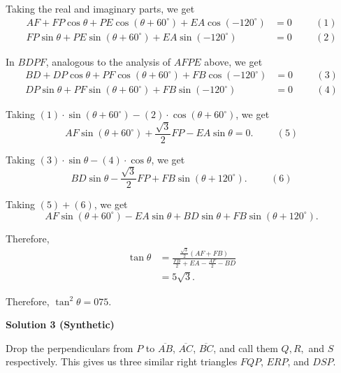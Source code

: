\begin{enumerate}
{{ Taking the real and imaginary parts, we get
 \begin{align*} AF + FP \cos \theta + PE \cos \left( \theta + 60^\circ \right) + EA \cos \left( - 120^\circ \right) & = 0 \hspace{1cm} (1) \\ FP \sin \theta + PE \sin \left( \theta + 60^\circ \right) + EA \sin \left( - 120^\circ \right) & = 0 \hspace{1cm} (2) \end{align*}


 In $BDPF$, analogous to the analysis of $AFPE$ above, we get
 \begin{align*} BD + DP \cos \theta + PF \cos \left( \theta + 60^\circ \right) + FB \cos \left( - 120^\circ \right) & = 0 \hspace{1cm} (3) \\ DP \sin \theta + PF \sin \left( \theta + 60^\circ \right) + FB \sin \left( - 120^\circ \right) & = 0 \hspace{1cm} (4) \end{align*}


 Taking $(1) \cdot \sin \left( \theta + 60^\circ \right) - (2) \cdot \cos \left( \theta + 60^\circ \right)$, we get
 \[ AF \sin \left( \theta + 60^\circ \right) + \frac{\sqrt{3}}{2} FP - EA \sin \theta = 0 . \hspace{1cm} (5) \]

 Taking $(3) \cdot \sin \theta - (4) \cdot \cos \theta$, we get
 \[ BD \sin \theta - \frac{\sqrt{3}}{2} FP + FB \sin \left( \theta + 120^\circ \right) . \hspace{1cm} (6) \]

 Taking $(5) + (6)$, we get
 \[ AF \sin \left( \theta + 60^\circ \right)  - EA \sin \theta + BD \sin \theta  + FB \sin \left( \theta + 120^\circ \right) . \]

 Therefore,
 \begin{align*} \tan \theta & = \frac{\frac{\sqrt{3}}{2} \left( AF + FB \right)} {\frac{FB}{2} + EA - \frac{AF}{2} - BD} \\ & = 5 \sqrt{3} . \end{align*}


 Therefore, $\tan^2 \theta = \boxed{075}$.

 



\textbf{Solution 3 (Synthetic)}

Drop the perpendiculars from $P$ to $\overline{AB}$, $\overline{AC}$, $\overline{BC}$, and call them $Q,R,$ and $S$ respectively. This gives us three similar right triangles $FQP$, $ERP$, and $DSP.$ 

}}
\end{enumerate}
